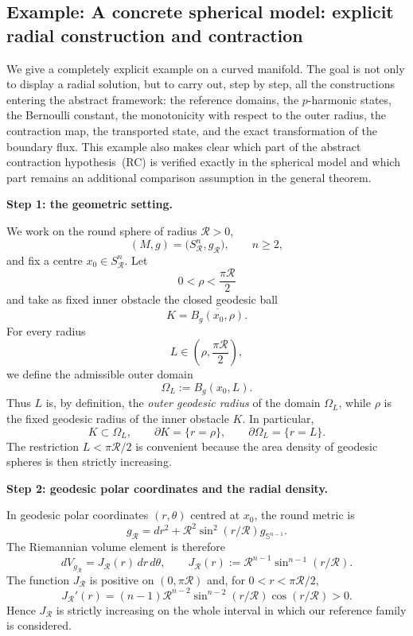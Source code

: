 \documentclass[11pt,a4paper]{article}
\theoremstyle{definition}
\theoremstyle{remark}
\begin{document}
\subsection{Example: A concrete spherical model: explicit radial construction and contraction}
\label{sec:spherical-radial-contraction}

We give a completely explicit example on a curved manifold. The goal is
not only to display a radial solution, but to carry out, step by step, all
the constructions entering the abstract framework: the reference domains,
the $p$-harmonic states, the Bernoulli constant, the monotonicity with
respect to the outer radius, the contraction map, the transported state,
and the exact transformation of the boundary flux. This example also makes
clear which part of the abstract contraction hypothesis~{\rm (RC)} is
verified exactly in the spherical model and which part remains an additional
comparison assumption in the general theorem.

\medskip
\noindent
\textbf{Step 1: the geometric setting.}

We work on the round sphere of radius $\mathcal R>0$,
\[
(M,g)=\bigl(S^n_{\mathcal R},g_{\mathcal R}\bigr),
\qquad n\ge2,
\]
and fix a centre $x_0\in S^n_{\mathcal R}$. Let
\[
0<\rho<\frac{\pi\mathcal R}{2}
\]
and take as fixed inner obstacle the closed geodesic ball
\[
K=\overline{B_g(x_0,\rho)}.
\]
For every radius
\[
L\in\left(\rho,\frac{\pi\mathcal R}{2}\right),
\]
we define the admissible outer domain
\[
\Omega_L:=B_g(x_0,L).
\]
Thus $L$ is, by definition, the \emph{outer geodesic radius} of the
domain $\Omega_L$, while $\rho$ is the fixed geodesic radius of the
inner obstacle $K$. In particular,
\[
K\subset\Omega_L,
\qquad
\partial K=\{r=\rho\},
\qquad
\partial\Omega_L=\{r=L\}.
\]
The restriction $L<\pi\mathcal R/2$ is convenient because the area density
of geodesic spheres is then strictly increasing.

\medskip
\noindent
\textbf{Step 2: geodesic polar coordinates and the radial density.}

In geodesic polar coordinates $(r,\theta)$ centred at $x_0$, the round
metric is
\[
g_{\mathcal R}
=dr^2+\mathcal R^2\sin^2(r/\mathcal R)
 g_{\mathbb S^{n-1}}.
\]
The Riemannian volume element is therefore
\[
dV_{g_{\mathcal R}}
=J_{\mathcal R}(r)\,dr\,d\theta,
\qquad
J_{\mathcal R}(r)
:=\mathcal R^{n-1}\sin^{n-1}(r/\mathcal R).
\]
The function $J_{\mathcal R}$ is positive on $(0,\pi\mathcal R)$ and,
for $0<r<\pi\mathcal R/2$,
\[
J_{\mathcal R}'(r)
=(n-1)\mathcal R^{n-2}
\sin^{n-2}(r/\mathcal R)\cos(r/\mathcal R)>0.
\]
Hence $J_{\mathcal R}$ is strictly increasing on the whole interval in
which our reference family is considered.
\end{document}
